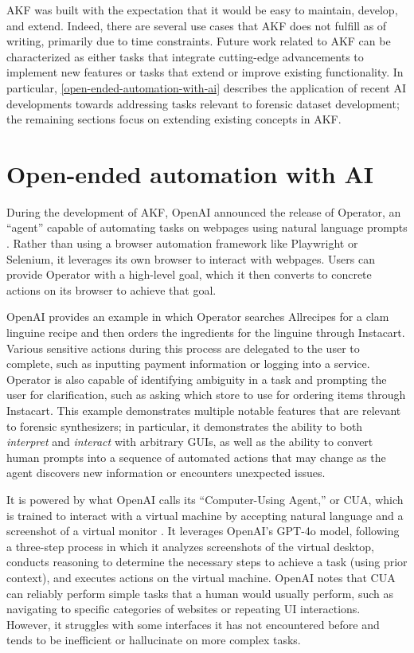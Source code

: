 AKF was built with the expectation that it would be easy to maintain,
develop, and extend. Indeed, there are several use cases that AKF does
not fulfill as of writing, primarily due to time constraints. Future
work related to AKF can be characterized as either tasks that integrate
cutting-edge advancements to implement new features or tasks that extend
or improve existing functionality. In particular, \autoref{open-ended-automation-with-ai} describes the application of
recent AI developments towards addressing tasks relevant to forensic
dataset development; the remaining sections focus on extending existing
concepts in AKF.

\section{Open-ended automation with
AI}\label{open-ended-automation-with-ai}

During the development of AKF, OpenAI announced the release of Operator,
an ``agent'' capable of automating tasks on webpages using natural
language prompts \cite{openaiIntroducingOperator2025}. Rather than
using a browser automation framework like Playwright or Selenium, it
leverages its own browser to interact with webpages. Users can provide
Operator with a high-level goal, which it then converts to concrete
actions on its browser to achieve that goal.

OpenAI provides an example in which Operator searches Allrecipes for a
clam linguine recipe and then orders the ingredients for the linguine
through Instacart. Various sensitive actions during this process are
delegated to the user to complete, such as inputting payment information
or logging into a service. Operator is also capable of identifying
ambiguity in a task and prompting the user for clarification, such as
asking which store to use for ordering items through Instacart. This
example demonstrates multiple notable features that are relevant to
forensic synthesizers; in particular, it demonstrates the ability to
both \emph{interpret} and \emph{interact} with arbitrary GUIs, as well
as the ability to convert human prompts into a sequence of automated
actions that may change as the agent discovers new information or
encounters unexpected issues.

It is powered by what OpenAI calls its ``Computer-Using Agent,'' or CUA,
which is trained to interact with a virtual machine by accepting natural
language and a screenshot of a virtual monitor
\cite{openaiComputerUsingAgent2025}. It leverages OpenAI's GPT-4o
model, following a three-step process in which it analyzes screenshots
of the virtual desktop, conducts reasoning to determine the necessary
steps to achieve a task (using prior context), and executes actions on
the virtual machine. OpenAI notes that CUA can reliably perform simple
tasks that a human would usually perform, such as navigating to specific
categories of websites or repeating UI interactions. However, it
struggles with some interfaces it has not encountered before and tends
to be inefficient or hallucinate on more complex tasks.

